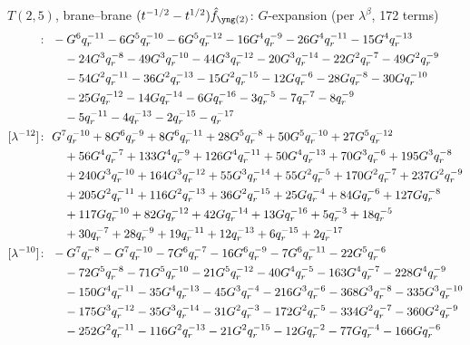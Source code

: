 $T(2,5)$, brane--brane $(t^{-1/2} - t^{1/2})\hat f_{\ytwo}$: $G$-expansion (per $\lambda^\beta$, 172 terms)
\begin{align*}
[\lambda^{-14}]\colon\ & -G^{6} \qr^{-11} -6 G^{5} \qr^{-10} -6 G^{5} \qr^{-12} -16 G^{4} \qr^{-9} -26 G^{4} \qr^{-11} -15 G^{4} \qr^{-13} \\
& \quad -24 G^{3} \qr^{-8} -49 G^{3} \qr^{-10} -44 G^{3} \qr^{-12} -20 G^{3} \qr^{-14} -22 G^{2} \qr^{-7} -49 G^{2} \qr^{-9} \\
& \quad -54 G^{2} \qr^{-11} -36 G^{2} \qr^{-13} -15 G^{2} \qr^{-15} -12 G \qr^{-6} -28 G \qr^{-8} -30 G \qr^{-10} \\
& \quad -25 G \qr^{-12} -14 G \qr^{-14} -6 G \qr^{-16} -3 \qr^{-5} -7 \qr^{-7} -8 \qr^{-9} \\
& \quad -5 \qr^{-11} -4 \qr^{-13} -2 \qr^{-15} -\qr^{-17} \\
[\lambda^{-12}]\colon\ & G^{7} \qr^{-10} +8 G^{6} \qr^{-9} +8 G^{6} \qr^{-11} +28 G^{5} \qr^{-8} +50 G^{5} \qr^{-10} +27 G^{5} \qr^{-12} \\
& \quad +56 G^{4} \qr^{-7} +133 G^{4} \qr^{-9} +126 G^{4} \qr^{-11} +50 G^{4} \qr^{-13} +70 G^{3} \qr^{-6} +195 G^{3} \qr^{-8} \\
& \quad +240 G^{3} \qr^{-10} +164 G^{3} \qr^{-12} +55 G^{3} \qr^{-14} +55 G^{2} \qr^{-5} +170 G^{2} \qr^{-7} +237 G^{2} \qr^{-9} \\
& \quad +205 G^{2} \qr^{-11} +116 G^{2} \qr^{-13} +36 G^{2} \qr^{-15} +25 G \qr^{-4} +84 G \qr^{-6} +127 G \qr^{-8} \\
& \quad +117 G \qr^{-10} +82 G \qr^{-12} +42 G \qr^{-14} +13 G \qr^{-16} +5 \qr^{-3} +18 \qr^{-5} \\
& \quad +30 \qr^{-7} +28 \qr^{-9} +19 \qr^{-11} +12 \qr^{-13} +6 \qr^{-15} +2 \qr^{-17} \\
[\lambda^{-10}]\colon\ & -G^{7} \qr^{-8} -G^{7} \qr^{-10} -7 G^{6} \qr^{-7} -16 G^{6} \qr^{-9} -7 G^{6} \qr^{-11} -22 G^{5} \qr^{-6} \\
& \quad -72 G^{5} \qr^{-8} -71 G^{5} \qr^{-10} -21 G^{5} \qr^{-12} -40 G^{4} \qr^{-5} -163 G^{4} \qr^{-7} -228 G^{4} \qr^{-9} \\
& \quad -150 G^{4} \qr^{-11} -35 G^{4} \qr^{-13} -45 G^{3} \qr^{-4} -216 G^{3} \qr^{-6} -368 G^{3} \qr^{-8} -335 G^{3} \qr^{-10} \\
& \quad -175 G^{3} \qr^{-12} -35 G^{3} \qr^{-14} -31 G^{2} \qr^{-3} -172 G^{2} \qr^{-5} -334 G^{2} \qr^{-7} -360 G^{2} \qr^{-9} \\
& \quad -252 G^{2} \qr^{-11} -116 G^{2} \qr^{-13} -21 G^{2} \qr^{-15} -12 G \qr^{-2} -77 G \qr^{-4} -166 G \qr^{-6} \\

\end{align*}
